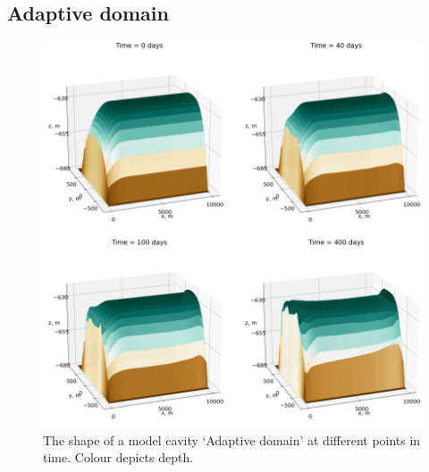 

\subsection{Adaptive domain} \label{sec:adaptive_dom_results}


\begin{figure}[!ht]
\centering
\includegraphics[width=1\textwidth]{chapters/4/adaptive_domain.png}
\caption[Adaptive domain]{The shape of a model cavity `Adaptive domain' at different points in time. Colour depicts depth.}
\label{fig:adaptive_domain}
\end{figure}

